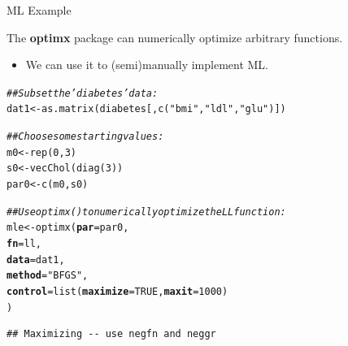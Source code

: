 \documentclass{beamer}\usepackage[]{graphicx}\usepackage[]{color}
\makeatletter
\newcommand{\hlnum}[1]{\textcolor[rgb]{0.69,0.494,0}{#1}}%
\newcommand{\hlstr}[1]{\textcolor[rgb]{0.749,0.012,0.012}{#1}}%
\newcommand{\hlcom}[1]{\textcolor[rgb]{0.514,0.506,0.514}{\textit{#1}}}%
\newcommand{\hlstd}[1]{\textcolor[rgb]{0,0,0}{#1}}%
\newcommand{\hlkwb}[1]{\textcolor[rgb]{0,0.341,0.682}{#1}}%
\newcommand{\hlkwc}[1]{\textcolor[rgb]{0,0,0}{\textbf{#1}}}%
\newcommand{\hlkwd}[1]{\textcolor[rgb]{0.004,0.004,0.506}{#1}}%
\newenvironment{kframe}{%
 \def\at@end@of@kframe{}%
 \ifinner\ifhmode%
  \def\at@end@of@kframe{\end{minipage}}%
  \begin{minipage}{\columnwidth}%
 \fi\fi%
 \def\FrameCommand##1{\hskip\@totalleftmargin \hskip-\fboxsep
 \colorbox{shadecolor}{##1}\hskip-\fboxsep
     \hskip-\linewidth \hskip-\@totalleftmargin \hskip\columnwidth}%
 \MakeFramed {\advance\hsize-\width
   \@totalleftmargin\z@ \linewidth\hsize
   \@setminipage}}%
 {\par\unskip\endMakeFramed%
 \at@end@of@kframe}
\newenvironment{knitrout}{}{} %
\makeatother
\begin{document}
\begin{frame}[fragile]{ML Example}
  
  The \textbf{optimx} package can numerically optimize arbitrary functions.
  \begin{itemize}
  \item We can use it to (semi)manually implement ML.
  \end{itemize}
  
\begin{knitrout}\scriptsize
{}\color{fgcolor}\begin{kframe}
\begin{alltt}
\hlcom{## Subset the 'diabetes' data:}
\hlstd{dat1} \hlkwb{<-} \hlkwd{as.matrix}\hlstd{(diabetes[ ,} \hlkwd{c}\hlstd{(}\hlstr{"bmi"}\hlstd{,} \hlstr{"ldl"}\hlstd{,} \hlstr{"glu"}\hlstd{)])}

\hlcom{## Choose some starting values:}
\hlstd{m0}   \hlkwb{<-} \hlkwd{rep}\hlstd{(}\hlnum{0}\hlstd{,} \hlnum{3}\hlstd{)}
\hlstd{s0}   \hlkwb{<-} \hlkwd{vecChol}\hlstd{(}\hlkwd{diag}\hlstd{(}\hlnum{3}\hlstd{))}
\hlstd{par0} \hlkwb{<-} \hlkwd{c}\hlstd{(m0, s0)}

\hlcom{## Use optimx() to numerically optimize the LL function:}
\hlstd{mle} \hlkwb{<-} \hlkwd{optimx}\hlstd{(}\hlkwc{par}     \hlstd{= par0,}
              \hlkwc{fn}      \hlstd{= ll,}
              \hlkwc{data}    \hlstd{= dat1,}
              \hlkwc{method}  \hlstd{=} \hlstr{"BFGS"}\hlstd{,}
              \hlkwc{control} \hlstd{=} \hlkwd{list}\hlstd{(}\hlkwc{maximize} \hlstd{=} \hlnum{TRUE}\hlstd{,} \hlkwc{maxit} \hlstd{=} \hlnum{1000}\hlstd{)}
              \hlstd{)}
\end{alltt}
\begin{verbatim}
## Maximizing -- use negfn and neggr
\end{verbatim}
\end{kframe}
\end{knitrout}

\end{frame}

\end{document}
